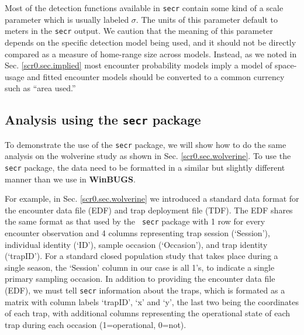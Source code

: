 Most of the detection functions available in \mbox{\tt secr} contain
some kind of a scale parameter which is usually labeled $\sigma$.  The
units of this parameter default to meters in the \mbox{\tt secr}
output.  We caution that the meaning of this parameter depends on the
specific detection model being used, and it should not be directly compared as a
measure of home-range size across models. Instead, as we noted in
Sec. \ref{scr0.sec.implied} most encounter probability models imply
a model of space-usage and fitted encounter models should be converted
to a common currency such as ``area used.''


\subsection{Analysis using the \mbox{\tt secr} package}
\label{mle.sec.wolvsecr}

To demonstrate the use of the \mbox{\tt secr} package, we will show
how to do the same analysis on the wolverine study as shown in
Sec. \ref{scr0.sec.wolverine}. To use the \mbox{\tt secr} package, the
data need to be formatted in a similar but slightly different manner
than we use in {\bf WinBUGS}.

For example, in Sec. \ref{scr0.sec.wolverine} we introduced a standard
data format for the encounter data file (EDF) and trap deployment file
(TDF). The EDF shares the same format as that used by the \mbox{\tt
  secr} package with 1 row for every encounter observation and 4
columns representing trap session (`Session'), individual identity
(`ID'), sample occasion (`Occasion'), and trap identity (`trapID').
For a standard closed population study that takes place during a
single season, the `Session' column in our case is all 1's, to indicate
a single primary sampling occasion.  In addition to providing the
encounter data file (EDF), we must tell \mbox{\tt secr} information
about the traps, which is formated as a matrix with column labels
`trapID', `x' and `y', the last two being the coordinates of each
trap, with additional columns representing the operational state of
each trap during each occasion (1=operational, 0=not).

